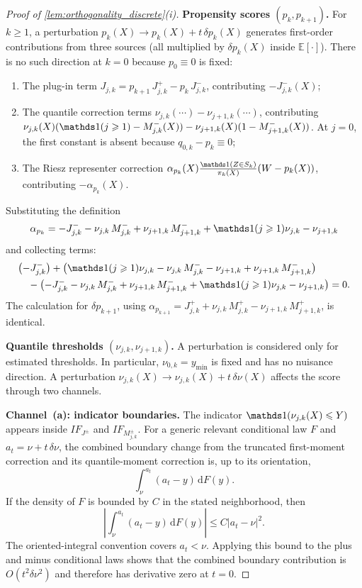 \begin{proof}[Proof of \cref{lem:orthogonality_discrete}\textup{(i)}]
\textbf{Propensity scores $(p_k, p_{k+1})$.}
For $k\geqslant1$, a perturbation $p_k(X) \to p_k(X) + t\,\delta p_k(X)$ generates first-order contributions from three sources (all multiplied by $\delta p_k(X)$ inside $\mathbb{E}[\cdot]$). There is no such direction at $k=0$ because $p_0\equiv0$ is fixed:
\begin{enumerate}
    \item[(i)] The plug-in term $J_{j,k} = p_{k+1}\,J_{j,k}^+ - p_k\,J_{j,k}^-$, contributing $-J_{j,k}^-(X)$;
    \item[(ii)] The quantile correction terms $\nu_{j,k}(\cdots) - \nu_{j+1,k}(\cdots)$, contributing $\nu_{j,k}(X)(\indicator(j\geqslant1) - M_{j,k}^-(X)) - \nu_{j+1,k}(X)(1 - M_{j+1,k}^-(X))$. At $j=0$, the first constant is absent because $q_{0,k}-p_k\equiv0$;
    \item[(iii)] The Riesz representer correction $\alpha_{p_k}(X)\frac{\indicator(Z \in S_k)}{\pi_k(X)}(W - p_k(X))$, contributing $-\alpha_{p_k}(X)$.
\end{enumerate}
Substituting the definition
\[
    \alpha_{p_k} = -J_{j,k}^- - \nu_{j,k}\,M_{j,k}^- + \nu_{j+1,k}\,M_{j+1,k}^- + \indicator(j\geqslant1)\nu_{j,k} - \nu_{j+1,k}
\]
and collecting terms:
\begin{align*}
    &\bigl(-J_{j,k}^-\bigr) + \bigl(\indicator(j\geqslant1)\nu_{j,k} - \nu_{j,k}\,M_{j,k}^- - \nu_{j+1,k} + \nu_{j+1,k}\,M_{j+1,k}^-\bigr) \\
    &\quad - \bigl(-J_{j,k}^- - \nu_{j,k}\,M_{j,k}^- + \nu_{j+1,k}\,M_{j+1,k}^- + \indicator(j\geqslant1)\nu_{j,k} - \nu_{j+1,k}\bigr) = 0.
\end{align*}
The calculation for $\delta p_{k+1}$, using $\alpha_{p_{k+1}} = J_{j,k}^+ + \nu_{j,k}\,M_{j,k}^+ - \nu_{j+1,k}\,M_{j+1,k}^+$, is identical.

\textbf{Quantile thresholds $(\nu_{j,k}, \nu_{j+1,k})$.}
A perturbation is considered only for estimated thresholds. In particular, $\nu_{0,k}=y_{\min}$ is fixed and has no nuisance direction.
A perturbation $\nu_{j,k}(X) \to \nu_{j,k}(X) + t\,\delta\nu(X)$ affects the score through two channels.

\textbf{Channel~(a): indicator boundaries.} The indicator $\indicator(\nu_{j,k}(X) \leqslant Y)$ appears inside $IF_{J^\pm}$ and $IF_{M_{j,k}^\pm}$. For a generic relevant conditional law $F$ and $a_t=\nu+t\,\delta\nu$, the combined boundary change from the truncated first-moment correction and its quantile-moment correction is, up to its orientation,
\[
    \int_{\nu}^{a_t}(a_t-y)\,\mathrm{d}F(y).
\]
If the density of $F$ is bounded by $C$ in the stated neighborhood, then
\[
    \left|\int_{\nu}^{a_t}(a_t-y)\,\mathrm{d}F(y)\right|
    \leqslant C|a_t-\nu|^2.
\]
The oriented-integral convention covers $a_t<\nu$. Applying this bound to the plus and minus conditional laws shows that the combined boundary contribution is $O(t^2\delta\nu^2)$ and therefore has derivative zero at $t=0$.


\end{proof}
